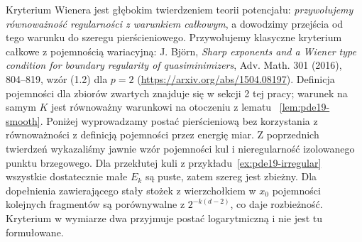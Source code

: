 \begin{uwaga}
Kryterium Wienera jest głębokim twierdzeniem teorii
potencjału: \emph{przywołujemy równoważność regularności
z warunkiem całkowym}, a dowodzimy przejścia od tego
warunku do szeregu pierścieniowego.
Przywołujemy klasyczne kryterium całkowe z pojemnością
wariacyjną: J. Bj\"orn, \emph{Sharp exponents and a Wiener
type condition for boundary regularity of quasiminimizers},
Adv. Math. 301 (2016), 804--819, wzór (1.2) dla $p=2$
(\url{https://arxiv.org/abs/1504.08197}).
Definicja pojemności dla zbiorów zwartych znajduje się
w sekcji 2 tej pracy; warunek na samym $K$ jest
równoważny warunkowi na otoczeniu z lematu
~\ref{lem:pde19-smooth}.
Poniżej wyprowadzamy postać pierścieniową bez korzystania
z równoważności z definicją pojemności przez energię miar.
Z poprzednich twierdzeń wykazaliśmy jawnie wzór
pojemności kul i nieregularność izolowanego punktu
brzegowego. Dla przekłutej kuli
z przykładu~\ref{ex:pde19-irregular} wszystkie dostatecznie małe
$E_k$ są puste, zatem szereg jest zbieżny. Dla dopełnienia
zawierającego stały stożek z wierzchołkiem w $x_0$
pojemności kolejnych fragmentów są porównywalne z
$2^{-k(d-2)}$, co daje rozbieżność. Kryterium w wymiarze
dwa przyjmuje postać logarytmiczną i nie jest tu
formułowane.
\end{uwaga}

